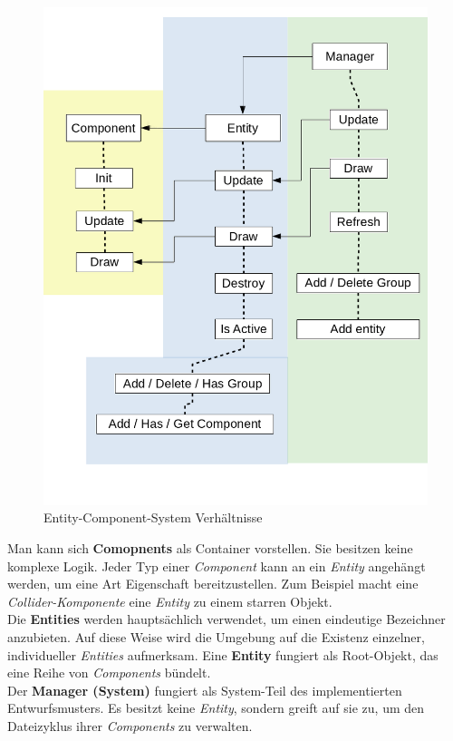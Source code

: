 \documentclass[
  10pt,
  a4paper,
  oneside,
  headers,
  headinclude,
  footinclude,
  BCOR5mm,
]{article}
\begin{document}
\begin{figure}[h]
  \centering
  \includegraphics[scale=0.3]{Scheme}
  \caption{Entity-Component-System Verhältnisse}
  \label{fig:ECS}
\end{figure}

Man kann sich \textbf{Comopnents} als Container vorstellen. Sie besitzen keine komplexe Logik. Jeder Typ einer \textit{Component} kann an ein \textit{Entity} angehängt werden, um eine Art Eigenschaft bereitzustellen. Zum Beispiel macht eine \textit{Collider-Komponente} eine \textit{Entity} zu einem starren Objekt.\\
Die \textbf{Entities} werden hauptsächlich verwendet, um einen eindeutige Bezeichner anzubieten. Auf diese Weise wird die Umgebung auf die Existenz einzelner, individueller \textit{Entities} aufmerksam. Eine \textbf{Entity} fungiert als Root-Objekt, das eine Reihe von \textit{Components} bündelt.\\
Der \textbf{Manager (System)} fungiert als System-Teil des implementierten Entwurfsmusters. Es besitzt keine \textit{Entity}, sondern greift auf sie zu, um den Dateizyklus ihrer \textit{Components} zu verwalten.
\end{document}
